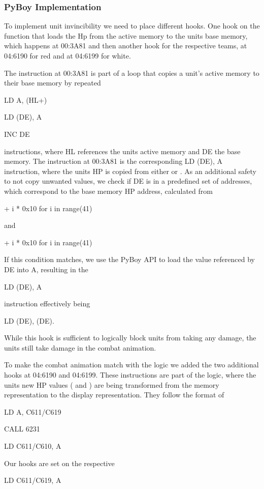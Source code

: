 \subsubsection{PyBoy Implementation}
To implement unit invincibility we need to place different hooks.
One hook on the function that loads the Hp from the active memory to the units base memory, which happens at 00:3A81 and then another hook for the respective teams, at 04:6190 for red and at 04:6199 for white.

The instruction at 00:3A81 is part of a loop that copies a unit's active memory to their base memory by repeated

LD A, (HL+)

LD (DE), A

INC DE

instructions, where HL references the units active memory and DE the base memory. The instruction at 00:3A81 is the corresponding LD (DE), A instruction, where the units HP is copied from either  or .
As an additional safety to not copy unwanted values, we check if DE is in a predefined set of addresses, which correspond to the base memory HP address, calculated from

  + i *  0x10 for i in range(41)
 
 and

  + i *  0x10 for i in range(41)
 
If this condition matches, we use the PyBoy API to load the value referenced by DE into A, resulting in the

LD (DE), A

instruction effectively being 

LD (DE), (DE).

While this hook is sufficient to logically block units from taking any damage, the units still take damage in the combat animation.

To make the combat animation match with the logic we added the two additional hooks at 04:6190 and 04:6199.
These instructions are part of the logic, where the units new HP values ( and ) are being transformed from the memory representation to the display representation.
They follow the format of

LD A, C611/C619

CALL 6231

LD C611/C610, A

Our hooks are set on the respective

LD C611/C619, A

